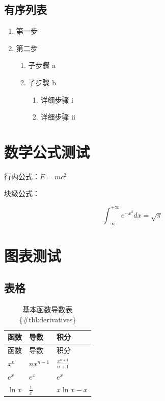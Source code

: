 \documentclass[
  11pt,
  letterpaper,
  oneside,
  a4paper]{book}
\providecommand{\tightlist}{%
  \setlength{\itemsep}{0pt}\setlength{\parskip}{0pt}}
\numberwithin{equation}{chapter}
\theoremstyle{plain}
\theoremstyle{plain}
\theoremstyle{plain}
\theoremstyle{plain}
\theoremstyle{definition}
\theoremstyle{remark}
\begin{document}
\subsection{有序列表}\label{ux6709ux5e8fux5217ux8868}

\begin{enumerate}
\def\labelenumi{\arabic{enumi}.}
\tightlist
\item
  第一步
\item
  第二步

  \begin{enumerate}
  \def\labelenumii{\alph{enumii}.}
  \tightlist
  \item
    子步骤 a
  \item
    子步骤 b

    \begin{enumerate}
    \def\labelenumiii{\roman{enumiii}.}
    \tightlist
    \item
      详细步骤 i
    \item
      详细步骤 ii
    \end{enumerate}
  \end{enumerate}
\end{enumerate}

\section{数学公式测试}\label{ux6570ux5b66ux516cux5f0fux6d4bux8bd5}

行内公式：\(E = mc^2\)

块级公式：

\begin{equation} \int_{-\infty}^{+\infty} e^{-x^2} dx = \sqrt{\pi} \end{equation}

\section{图表测试}\label{ux56feux8868ux6d4bux8bd5}

\subsection{表格}\label{ux8868ux683c}

\begin{longtable}[]{@{}lll@{}}
\caption{基本函数导数表 \{\#tbl:derivatives\}}\tabularnewline
\toprule\noalign{}
函数 & 导数 & 积分 \\
\midrule\noalign{}
\endfirsthead
\toprule\noalign{}
函数 & 导数 & 积分 \\
\midrule\noalign{}
\endhead
\bottomrule\noalign{}
\endlastfoot
\(x^n\) & \(nx^{n-1}\) & \(\frac{x^{n+1}}{n+1}\) \\
\(e^x\) & \(e^x\) & \(e^x\) \\
\(\ln x\) & \(\frac{1}{x}\) & \(x\ln x - x\) \\
\end{longtable}
\end{document}
